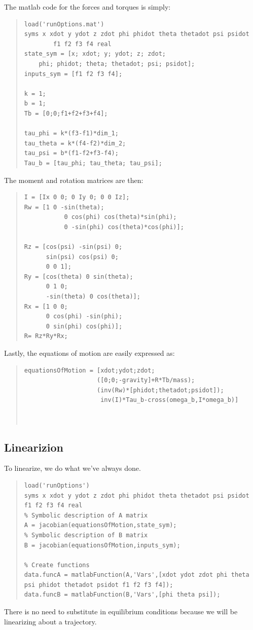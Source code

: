 \documentclass[12pt]{article}
\begin{document}
The matlab code for the forces and torques is simply:
\begin{quote}
\begin{lstlisting}
load('runOptions.mat')
syms x xdot y ydot z zdot phi phidot theta thetadot psi psidot 
     	f1 f2 f3 f4 real
state_sym = [x; xdot; y; ydot; z; zdot; 
	phi; phidot; theta; thetadot; psi; psidot];
inputs_sym = [f1 f2 f3 f4];

k = 1;
b = 1;
Tb = [0;0;f1+f2+f3+f4];

tau_phi = k*(f3-f1)*dim_1;
tau_theta = k*(f4-f2)*dim_2;
tau_psi = b*(f1-f2+f3-f4);
Tau_b = [tau_phi; tau_theta; tau_psi];

\end{lstlisting}
\end{quote}
\clearpage
The moment and rotation matrices are then:
\begin{quote}
\begin{lstlisting}
I = [Ix 0 0; 0 Iy 0; 0 0 Iz];
Rw = [1 0 -sin(theta); 
           0 cos(phi) cos(theta)*sin(phi); 
           0 -sin(phi) cos(theta)*cos(phi)];

Rz = [cos(psi) -sin(psi) 0;
      sin(psi) cos(psi) 0;
      0 0 1];
Ry = [cos(theta) 0 sin(theta);
      0 1 0;
      -sin(theta) 0 cos(theta)];
Rx = [1 0 0;
      0 cos(phi) -sin(phi);
      0 sin(phi) cos(phi)];
R= Rz*Ry*Rx;  

\end{lstlisting}
\end{quote}
Lastly, the equations of motion are easily expressed as:
\begin{quote}
\begin{lstlisting}
equationsOfMotion = [xdot;ydot;zdot;
                    ([0;0;-gravity]+R*Tb/mass);
                    (inv(Rw)*[phidot;thetadot;psidot]);
                     inv(I)*Tau_b-cross(omega_b,I*omega_b)]
                     
                     
\end{lstlisting}
\end{quote}


\subsection{Linearizion}
To linearize, we do what we've always done. 
\begin{quote}
\begin{lstlisting}
load('runOptions')
syms x xdot y ydot z zdot phi phidot theta thetadot psi psidot f1 f2 f3 f4 real
% Symbolic description of A matrix
A = jacobian(equationsOfMotion,state_sym);
% Symbolic description of B matrix
B = jacobian(equationsOfMotion,inputs_sym);

% Create functions
data.funcA = matlabFunction(A,'Vars',[xdot ydot zdot phi theta psi phidot thetadot psidot f1 f2 f3 f4]);
data.funcB = matlabFunction(B,'Vars',[phi theta psi]);

\end{lstlisting}
\end{quote}
There is no need to substitute in equilibrium conditions because we will be linearizing about a trajectory.
\end{document}
